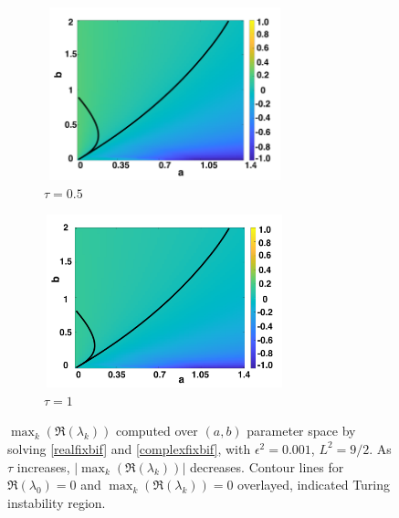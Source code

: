 \begin{figure}[H]
  \centering
\begin{subfigure}[t]{0.45\textwidth}
    \centering
    \includegraphics[width=7cm,height=5cm]{tau05bif.png}
    \caption{$\tau=0.5$}
    \label{}
\end{subfigure}
\hfill
\begin{subfigure}[t]{0.45\textwidth}
    \centering
    \includegraphics[width=7cm,height=5cm]{tau1bif.png}
    \caption{$\tau=1$}
    \label{}
\end{subfigure}
\caption{$\max_k(\Re(\lambda_k))$ computed over $(a,b)$ parameter space by solving \eqref{realfixbif} and \eqref{complexfixbif}, with $\epsilon^2=0.001$, $L^2=9/2$. As $\tau$ increases, $|\max_k(\Re(\lambda_k))|$ decreases. Contour lines for $\Re(\lambda_0)=0$ and $\max_k(\Re(\lambda_k))=0$ overlayed, indicated Turing instability region. }
\label{fig:Bbif1}
\end{figure}
